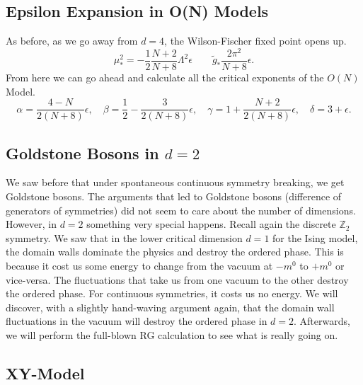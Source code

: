 
\subsection{Epsilon Expansion in O(N) Models}%
\label{sub:epsilon_expansion_in_o_n_models}

As before, as we go away from $d = 4$, the Wilson-Fischer fixed point opens up.
\begin{equation}
  \mu_*^2 = -\frac{1}{2} \frac{N + 2}{N + 8} \Lambda^2 \epsilon \qquad \widetilde{g}_* \frac{2\pi^2}{N+8} \epsilon.
\end{equation}
From here we can go ahead and calculate all the critical exponents of the $O(N)$ Model.
\begin{equation}
  \alpha = \frac{4 - N}{2(N + 8)} \epsilon, \quad \beta = \frac{1}{2}- \frac{3}{2(N + 8)} \epsilon, \quad \gamma = 1 + \frac{N +2}{2(N + 8)} \epsilon, \quad \delta = 3 + \epsilon.
\end{equation}

\subsection{Goldstone Bosons in \texorpdfstring{$d=2$}{two dimensions}}%
\label{sub:goldstone_bosons_in_d_2}

We saw before that under spontaneous continuous symmetry breaking, we get Goldstone bosons.
The arguments that led to Goldstone bosons (difference of generators of symmetries) did not seem to care about the number of dimensions.
However, in $d = 2$ something very special happens.
Recall again the discrete $\mathbb{Z}_2$ symmetry. We saw that in the lower critical dimension $d = 1$ for the Ising model, the domain walls dominate the physics and destroy the ordered phase.
This is because it cost us some energy to change from the vacuum at $-m^0$ to $+m^0$ or vice-versa.
The fluctuations that take us from one vacuum to the other destroy the ordered phase.
For continuous symmetries, it costs us no energy. We will discover, with a slightly hand-waving argument again, that the domain wall fluctuations in the vacuum will destroy the ordered phase in $d = 2$. Afterwards, we will perform the full-blown RG calculation to see what is really going on.

\subsection*{XY-Model}%

